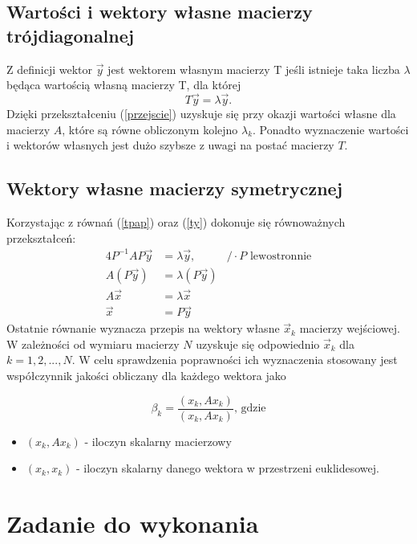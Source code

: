 \subsection{Wartości i wektory własne macierzy trójdiagonalnej}

Z definicji wektor $ \vec{y} $ jest wektorem własnym macierzy T jeśli istnieje taka liczba $\lambda$ będąca wartością własną macierzy T, dla której 
\begin{equation}
 T\vec{y} = \lambda \vec{y}.
 \label{ty}
\end{equation}
Dzięki przekształceniu (\ref{przejscie}) uzyskuje się przy okazji wartości własne dla macierzy $ A $, które są równe obliczonym kolejno $\lambda_k$. Ponadto wyznaczenie wartości i wektorów własnych jest dużo szybsze z uwagi na postać macierzy $ T $.

\subsection{Wektory własne macierzy symetrycznej}

Korzystając z równań (\ref{tpap}) oraz (\ref{ty}) dokonuje się równoważnych przekształceń:
\begin{alignat*}{4}
P^{-1}AP\vec{y} &= \lambda\vec{y}, &/ \cdot P \text{ lewostronnie} \\
A(P\vec{y}) &= \lambda(P\vec{y}) \\
A\vec{x} &= \lambda\vec{x} \\
\vec{x} &= P\vec{y}
\end{alignat*}
Ostatnie równanie wyznacza przepis na wektory własne $ \vec{x}_k $ macierzy wejściowej. W zależności od wymiaru macierzy $ N $ uzyskuje się odpowiednio $ \vec{x}_k $ dla $ k = 1, 2, ..., N $. W celu sprawdzenia poprawności ich wyznaczenia stosowany jest współczynnik jakości obliczany dla każdego wektora jako

\begin{equation}
\beta_k = \frac{(x_k, Ax_k)}{(x_k, Ax_k)} \text{, gdzie}
\label{beta}
\end{equation}
\begin{itemize}
	\item$(x_k, Ax_k) $ - iloczyn skalarny macierzowy 
	\item$(x_k, x_k) $ - iloczyn skalarny danego wektora w przestrzeni euklidesowej.
\end{itemize}

\section{Zadanie do wykonania}

